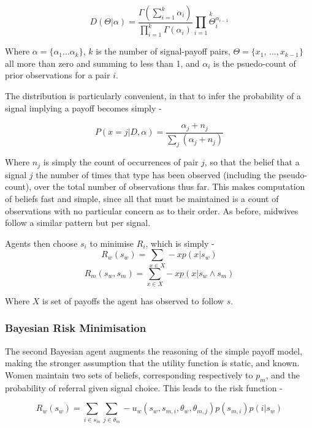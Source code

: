\[
D(\Theta|\alpha)=\frac{\Gamma(\sum_{i=1}^{k}\alpha_{i})}{\prod_{i=1}^{k}\Gamma(\alpha_{i})}\overset{k}{\underset{i=1}{\prod}\Theta_{i}^{\alpha_{i-1}}}
\]


Where \(\alpha=\{\alpha_{1}\ldots\alpha_{k}\}\), \(k\) is the number
of signal-payoff pairs, \(\Theta=\{x_{1},\,\ldots,x_{k-\text{1}}\}\) all
more than zero and summing to less than 1, and \(\alpha_{i}\) is the 
psuedo-count of prior observations for a pair \(i\). 

The distribution is particularly convenient, in that to infer the
probability of a signal implying a payoff becomes
simply -

\begin{equation}
P(x=j|D,\alpha)=\frac{\alpha_{j}+n_{j}}{\sum_{j}(\alpha_{j}+n_{j})}\label{eq:posterior}
\end{equation}


Where \(n_{j}\) is simply the count of occurrences of pair \(j\), so
that the belief that a signal \(j\) the number
of times that type has been observed (including the pseudo-count),
over the total number of observations thus far. This makes computation
of beliefs fast and simple, since all that must be maintained is
a count of observations with no particular concern as to their order.
As before, midwives follow a similar pattern but per signal.

Agents then choose $s_{i}$ to minimise $R_{i}$, which is simply - 
\begin{equation}
R_{w}(s_{w}) = \sum_{x \in X} -xp(x | s_{w})
\end{equation}
\begin{equation}
R_{m}(s_{w}, s_{m}) = \sum_{x \in X} -xp(x | s_{w}\wedge s_{m})
\end{equation}

Where $X$ is set of payoffs the agent has observed to follow $s$.

\subsubsection{Bayesian Risk Minimisation}

The second Bayesian agent augments the reasoning of the simple payoff model, making the stronger assumption that the utility function is static, and known. Women maintain two sets of beliefs, corresponding respectively to \(p_{m}\), and the probability of referral given signal choice. This leads to the risk function -

\begin{equation}
R_{w}(s_{w}) = \sum_{i\in s_{m}}\sum_{j\in \theta_{m}} -u_{w}(s_{w}, s_{m, i}, \theta_{w}, \theta_{m, j})p(s_{m,i})p(i | s_{w})
\end{equation}

